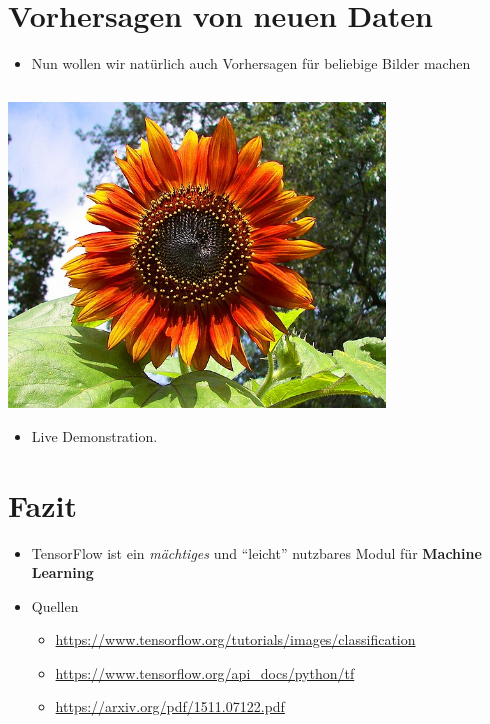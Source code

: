 \documentclass[t]{beamer}
\newcommand\pycode[1]{\inputminted[frame=lines, framesep=2mm, fontsize=\normalsize]{python}{#1}}
\begin{document}
\section{Vorhersagen von neuen Daten}
\begin{frame}
    \begin{itemize}
        \item Nun wollen wir natürlich auch Vorhersagen für beliebige Bilder machen
    \end{itemize}
    \pycode{./code-snippets/predict-new-image.py}
    \begin{minipage}{0.5\textwidth}
        \includegraphics[width=0.75\textwidth]{./teach-plots/592px-Red_sunflower.jpg}
    \end{minipage}\hfill
    \begin{minipage}{0.5\textwidth}
        \begin{itemize}
            \item \textcolor{rwthblue}{Live Demonstration.}
        \end{itemize}
    \end{minipage}
\end{frame}

\section{Fazit}
\begin{frame}
    \begin{itemize}
        \item TensorFlow ist ein \emph{mächtiges} und \enquote{leicht} nutzbares Modul für \textbf{Machine Learning}
        \newline
        \item Quellen
        \begin{itemize}
            \item \href{https://www.tensorflow.org/tutorials/images/classification}{https://www.tensorflow.org/tutorials/images/classification}
            \item \href{https://www.tensorflow.org/api\_docs/python/tf}{https://www.tensorflow.org/api\_docs/python/tf}
            \item \href{https://arxiv.org/pdf/1511.07122.pdf}{https://arxiv.org/pdf/1511.07122.pdf}
        \end{itemize}
    \end{itemize}
\end{frame}
\end{document}
